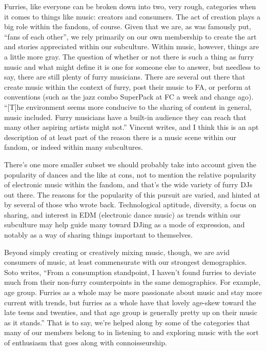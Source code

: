 Furries, like everyone can be broken down into two, very rough, categories when it comes to things like music: creators and consumers. The act of creation plays a big role within the fandom, of course. Given that we are, as was famously put, ``fans of each other'', we rely primarily on our own membership to create the art and stories appreciated within our subculture. Within music, however, things are a little more gray. The question of whether or not there is such a thing as furry music and what might define it is one for someone else to answer, but needless to say, there are still plenty of furry musicians. There are several out there that create music within the context of furry, post their music to FA, or perform at conventions (such as the jazz combo SuperPack at FC a week and change ago). ``{[}T{]}he environment seems more conducive to the sharing of content in general, music included. Furry musicians have a built-in audience they can reach that many other aspiring artists might not.'' Vincent writes, and I think this is an apt description of at least part of the reason there is a music scene within our fandom, or indeed within many subcultures.

There's one more smaller subset we should probably take into account given the popularity of dances and the like at cons, not to mention the relative popularity of electronic music within the fandom, and that's the wide variety of furry DJs out there. The reasons for the popularity of this pursuit are varied, and hinted at by several of those who wrote back. Technological aptitude, diversity, a focus on sharing, and interest in EDM (electronic dance music) as trends within our subculture may help guide many toward DJing as a mode of expression, and notably as a way of sharing things important to themselves.

Beyond simply creating or creatively mixing music, though, we are avid consumers of music, at least commensurate with our strongest demographics. Soto writes, ``From a consumption standpoint, I haven't found furries to deviate much from their non-furry counterpoints in the same demographics. For example, age group. Furries as a whole may be more passionate about music and stay more current with trends, but furries as a whole have that lovely age-skew toward the late teens and twenties, and that age group is generally pretty up on their music as it stands.'' That is to say, we're helped along by some of the categories that many of our members belong to in listening to and exploring music with the sort of enthusiasm that goes along with connoisseurship.

